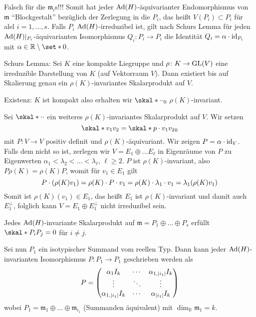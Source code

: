 \begin{bemerkung*}
	Falsch für die $\mathfrak{m}_i$s!!!
	Somit hat jeder $\Ad(H)$-äquivarianter Endomorphismus von $\mathfrak{m}$ \enquote{Blockgestalt} bezüglich der Zerlegung in die $P_i$, das heißt $V(P_i) \subset P_i$ für alel $i=1,\ldots ,s$.
	Falls $P_i$ $\Ad(H)$-irreduzibel ist, gilt nach Schurs Lemma für jeden $\Ad(H)|_{P_i}$-äquivarianten Isomorphismus $Q_i \colon P_i \to P_i$ die Identität $Q_i = \alpha \cdot {\id_{P_i}}$ mit $\alpha \in \mathbb{R}\setminus \set*{0}$.
\end{bemerkung*}

Schurs Lemma: Sei $K$ eine kompakte Liegruppe und $\rho \colon K \to \GL(V)$ eine irreduzible Darstellung von $K$ (auf Vektorraum $V$).
Dann existiert bis auf Skalierung genau ein $\rho(K)$-invariantes Skalarprodukt auf $V$.
\begin{beweis}
	Existenz: $K$ ist kompakt also erhalten wir $\skal*{\cdot }{\cdot }_0$ $\rho(K)$-invariant.
	
	Sei $\skal*{\cdot }{\cdot }$ ein weiteres $\rho(K)$-invariantes Skalarprodukt auf $V$.
	Wir setzen 
	\[
		\skal*{v_1}{v_2} = \skal*{p \cdot v_1}{v_2}_0
	\]
	mit $P \colon V\to V$ positiv definit und $\rho(K)$-äquivariant.
	Wir zeigen $P = \alpha \cdot {\id_V}$.
	Falls dem nicht so ist, zerlegen wir $V = E_1 \oplus  \ldots E_\ell$ in Eigenräume von $P$ zu Eigenwerten $\alpha_1 < \lambda_2 < \ldots < \lambda_\ell$, $\ell \ge 2$.
	$P$ ist $\rho(K)$-invariant, also $P \rho(K) = \rho(K) P$, womit für $v_1 \in  E_1$ gilt
	\[
		P \cdot \enbrace*{\rho(K) v_1} = \rho(K) \cdot P \cdot v_1 = \rho(K) \cdot \lambda_1 \cdot v_1 = \lambda_1 \enbrace*{\rho(K) v_1}
	\]
	Somit ist $\rho(K)(v_1) \in E_1$, das heißt $E_1$ ist $\rho(K)$-invariant und damit auch $E_1^\perp$, folglich kann $V =E_1 \oplus E_1^\perp$ nicht irreduzibel sein.
\end{beweis}

\begin{korollar}
	Jedes $\Ad(H)$-invariante Skalarprodukt auf $\mathfrak{m} = P_1 \oplus \ldots \oplus P_s$ erfüllt $\skal*{P_i}{P_j}=0$ für $i\neq j$.
\end{korollar}

Sei nun $P_1$ ein isotypischer Summand vom reellen Typ.
Dann kann jeder $\Ad(H)$-invarianten Isomorphismus $P \colon P_1 \to P_1$ geschrieben werden als
\[
	P= \begin{pmatrix}
		\alpha_1 I_k & \cdots &  \alpha_{1,\abs*{i_1} }I_k \\
		\vdots & \ddots & \vdots \\
		\alpha_{1,\abs*{i_1}} I_k & \cdots & \alpha_{\abs{i_1}} I_k
	\end{pmatrix}
\]
wobei $P_1 = \mathfrak{m}_1 \oplus  \ldots \oplus \mathfrak{m}_{i_1}$ (Summanden äquivalent) mit $\dim_\mathbb{R} \mathfrak{m}_1 = k$.


